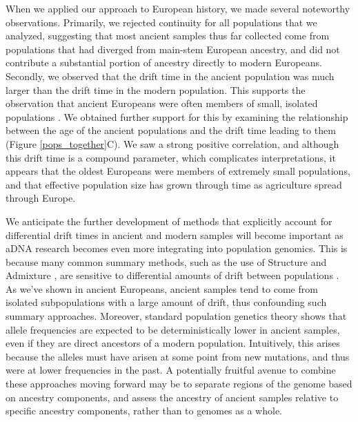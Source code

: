 \documentclass[11pt, oneside]{article}   	%
\begin{document}
When we applied our approach to European history, we made several noteworthy observations. Primarily, we rejected continuity for all populations that we analyzed, suggesting that most ancient samples thus far collected come from populations that had diverged from main-stem European ancestry, and did not contribute a substantial portion of ancestry directly to modern Europeans. Secondly, we observed that the drift time in the ancient population was much larger than the drift time in the modern population. This supports the observation that ancient Europeans were often members of small, isolated populations \citep{skoglund2014genomic}. We obtained further support for this by examining the relationship between the age of the ancient populations and the drift time leading to them (Figure \ref{pops_together}C). We saw a strong positive correlation, and although this drift time is a compound parameter, which complicates interpretations, it appears that the oldest Europeans were members of extremely small populations, and that effective population size has grown through time as agriculture spread through Europe.

We anticipate the further development of methods that explicitly account for differential drift times in ancient and modern samples will become important as aDNA research becomes even more integrating into population genomics. This is because many common summary methods, such as the use of Structure \citep{pritchard2000inference} and Admixture \citep{alexander2009fast}, are sensitive to differential amounts of drift between populations \citep{falush2016tutorial}. As we've shown in ancient Europeans, ancient samples tend to come from isolated subpopulations with a large amount of drift, thus confounding such summary approaches. Moreover, standard population genetics theory shows that allele frequencies are expected to be deterministically lower in ancient samples, even if they are direct ancestors of a modern population. Intuitively, this arises because the alleles must have arisen at some point from new mutations, and thus were at lower frequencies in the past. A potentially fruitful avenue to combine these approaches moving forward may be to separate regions of the genome based on ancestry components, and assess the ancestry of ancient samples relative to specific ancestry components, rather than to genomes as a whole.
\end{document}
